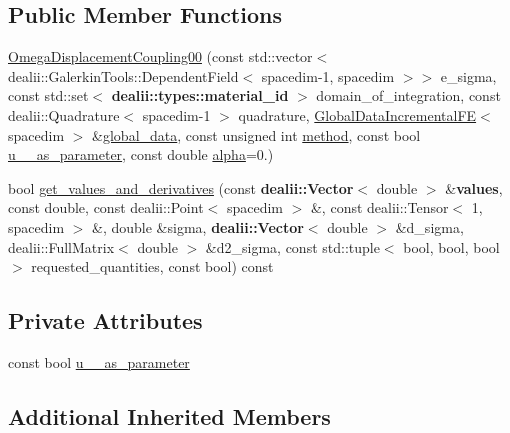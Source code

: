 \subsection*{Public Member Functions}
\begin{DoxyCompactItemize}
\item 
\hyperlink{classincremental_f_e_1_1_omega_displacement_coupling00_abdd9eadc99c1c194d26b94006a02566e}{Omega\+Displacement\+Coupling00} (const std\+::vector$<$ dealii\+::\+Galerkin\+Tools\+::\+Dependent\+Field$<$ spacedim-\/1, spacedim $>$$>$ e\+\_\+sigma, const std\+::set$<$ {\bf dealii\+::types\+::material\+\_\+id} $>$ domain\+\_\+of\+\_\+integration, const dealii\+::\+Quadrature$<$ spacedim-\/1 $>$ quadrature, \hyperlink{classincremental_f_e_1_1_global_data_incremental_f_e}{Global\+Data\+Incremental\+FE}$<$ spacedim $>$ \&\hyperlink{classincremental_f_e_1_1_omega_abd23d288a7a4a43f9b528be968cd2113}{global\+\_\+data}, const unsigned int \hyperlink{classincremental_f_e_1_1_omega_a7600d263ebf98129629e44fa67e8a58c}{method}, const bool \hyperlink{classincremental_f_e_1_1_omega_displacement_coupling00_a1dc29cbc64a8477b06f1a01472783e5e}{u\+\_\+\_\+as\+\_\+parameter}, const double \hyperlink{classincremental_f_e_1_1_omega_a891688560ec0ad8dc5a0058a7b400269}{alpha}=0.)
\item 
bool \hyperlink{classincremental_f_e_1_1_omega_displacement_coupling00_add2792deb962c321509264fce6fbdec5}{get\+\_\+values\+\_\+and\+\_\+derivatives} (const {\bf dealii\+::\+Vector}$<$ double $>$ \&{\bf values}, const double, const dealii\+::\+Point$<$ spacedim $>$ \&, const dealii\+::\+Tensor$<$ 1, spacedim $>$ \&, double \&sigma, {\bf dealii\+::\+Vector}$<$ double $>$ \&d\+\_\+sigma, dealii\+::\+Full\+Matrix$<$ double $>$ \&d2\+\_\+sigma, const std\+::tuple$<$ bool, bool, bool $>$ requested\+\_\+quantities, const bool) const 
\end{DoxyCompactItemize}
\subsection*{Private Attributes}
\begin{DoxyCompactItemize}
\item 
const bool \hyperlink{classincremental_f_e_1_1_omega_displacement_coupling00_a1dc29cbc64a8477b06f1a01472783e5e}{u\+\_\+\_\+as\+\_\+parameter}
\end{DoxyCompactItemize}
\subsection*{Additional Inherited Members}


